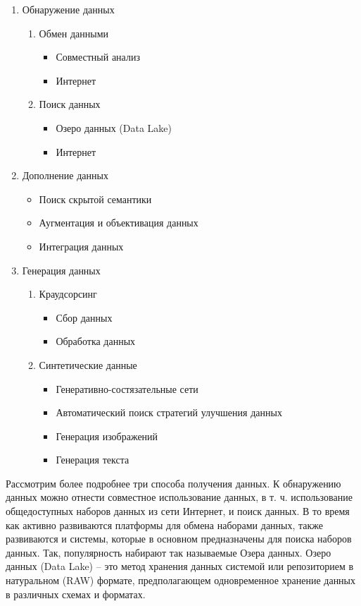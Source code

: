 \documentclass[12pt,a4paper, oneside]{extreport}
\begin{document}
\begin{enumerate}
	\item Обнаружение данных
	\begin{enumerate}
		\item Обмен данными
		\begin{itemize}
			\item Совместный анализ
			\item Интернет
		\end{itemize}
		\item Поиск данных 
		\begin{itemize}
			\item Озеро данных (Data Lake) 
			\item Интернет
		\end{itemize}
	\end{enumerate}
	\item Дополнение   данных 
	\begin{itemize}
		\item Поиск  скрытой семантики 
		\item   Аугментация и объективация данных 
		\item  Интеграция данных 
	\end{itemize}
	\item  Генерация данных
	\begin{enumerate}
		\item Краудсорсинг 
		\begin{itemize}
			\item Сбор данных
			\item Обработка данных
		\end{itemize}
		\item Синтетические данные
		\begin{itemize}
			\item  Генеративно-состязательные сети 
			\item  Автоматический поиск стратегий улучшения данных
			\item  Генерация изображений
			\item  Генерация текста
		\end{itemize}
	\end{enumerate}
\end{enumerate}

Рассмотрим  более подробнее три способа получения данных.
К обнаружению данных можно отнести совместное использование данных, в т. ч. использование  общедоступных наборов данных из сети Интернет, и поиск данных.
В то время как активно развиваются  платформы для обмена наборами данных, также развиваются и  системы, которые в основном предназначены для поиска наборов данных. 
Так, популярность набирают так называемые Озера данных. Озеро данных (Data Lake) – это метод хранения данных системой или репозиторием в натуральном (RAW) формате, предполагающем одновременное хранение данных в различных схемах и форматах. 
\end{document}
